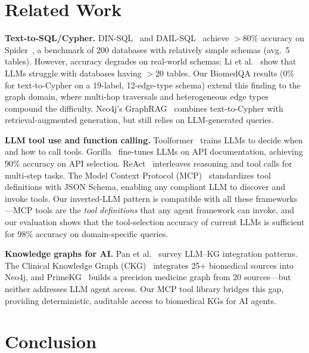 \documentclass[sigconf, anonymous, review]{acmart}
\begin{document}
\section{Related Work}\label{sec:related}

\textbf{Text-to-SQL/Cypher.}
DIN-SQL~\cite{pourreza2024dinsql} and DAIL-SQL~\cite{gao2024texttosql}
achieve $>$80\% accuracy on Spider~\cite{yu2018spider}, a benchmark
of 200 databases with relatively simple schemas (avg.\ 5 tables).
However, accuracy degrades on real-world schemas: Li
et al.~\cite{li2024dawn} show that LLMs struggle with
databases having $>$20 tables.  Our BiomedQA results (0\% for
text-to-Cypher on a 19-label, 12-edge-type schema) extend this
finding to the graph domain, where multi-hop traversals and
heterogeneous edge types compound the difficulty.
Neo4j's GraphRAG~\cite{neo4j_graphrag} combines text-to-Cypher
with retrieval-augmented generation, but still relies on
LLM-generated queries.

\smallskip\noindent\textbf{LLM tool use and function calling.}
Toolformer~\cite{schick2024toolformer} trains LLMs to decide when
and how to call tools.  Gorilla~\cite{patil2023gorilla} fine-tunes
LLMs on API documentation, achieving 90\% accuracy on API
selection.  ReAct~\cite{yao2023react} interleaves reasoning and
tool calls for multi-step tasks.  The Model Context Protocol
(MCP)~\cite{anthropic2024mcp} standardizes tool definitions
with JSON Schema, enabling any compliant LLM to discover and
invoke tools.  Our inverted-LLM pattern is compatible with all
these frameworks---MCP tools are the \emph{tool definitions}
that any agent framework can invoke, and our evaluation shows
that the tool-selection accuracy of current LLMs is sufficient
for 98\% accuracy on domain-specific queries.

\smallskip\noindent\textbf{Knowledge graphs for AI.}
Pan et al.~\cite{pan2024unifying} survey LLM--KG integration
patterns.  The Clinical Knowledge Graph
(CKG)~\cite{santos2022ckg} integrates 25+ biomedical sources
into Neo4j, and PrimeKG~\cite{chandak2023primekg} builds a
precision medicine graph from 20 sources---but neither addresses
LLM agent access.  Our MCP tool library bridges this gap,
providing deterministic, auditable access to biomedical KGs
for AI agents.

\section{Conclusion}
\end{document}
